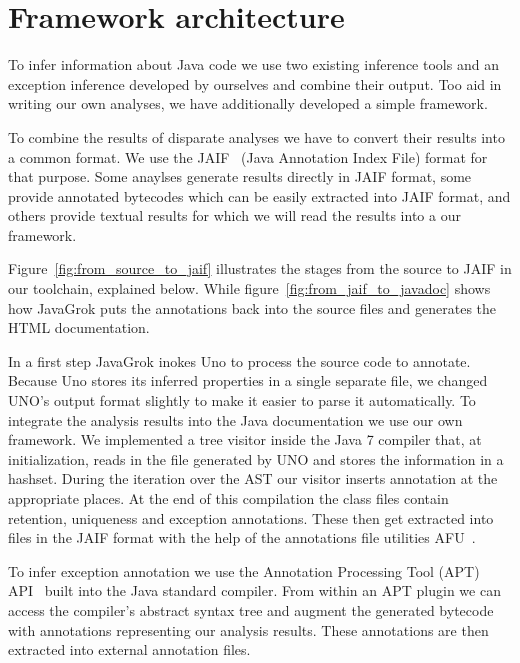 \section{Framework architecture}

\begin{figure*}
\centering
{}
\caption{Toolchain from source to JAIF}
\label{fig:from_source_to_jaif}
\end{figure*}

To infer information about Java code we use two existing inference tools and 
an exception inference developed by ourselves and combine their output. 
Too aid in writing our own analyses, we have additionally developed a simple 
framework. 

To combine the results of disparate analyses we have to convert their results
into a common format.  We use the JAIF~\cite{JAIF}
(Java Annotation Index File) format for that purpose.  Some anaylses generate
results directly in JAIF format, some provide annotated bytecodes which can be
easily extracted into JAIF format, and others provide textual results for which
we will read the results into a our framework.

Figure~\ref{fig:from_source_to_jaif} 
illustrates the stages from the source to JAIF in our toolchain, explained 
below. While figure~\ref{fig:from_jaif_to_javadoc} shows how JavaGrok
puts the annotations back into the source files and generates the HTML
documentation.

In a first step JavaGrok inokes Uno to process the source code to annotate. 
Because Uno stores its inferred properties in a single separate file, 
we changed UNO's output format slightly to make it easier to parse it automatically.
To integrate the analysis results into the Java documentation we
use our own framework. We implemented a tree visitor inside the Java 7 
compiler that, at initialization, reads in the file generated by UNO and 
stores the information in a hashset. During the iteration over the AST
our visitor inserts annotation at the appropriate places. At the end of
this compilation the class files contain retention, uniqueness and exception 
annotations. These then get extracted into files in the JAIF format with the
help of the annotations file utilities AFU~\cite{AFU}.

To infer exception annotation we use the Annotation Processing Tool (APT)
API~\cite{apt} built into the Java standard compiler.
From within an APT plugin
we can access the compiler's abstract syntax tree and augment the generated
bytecode with annotations representing our analysis results. These annotations
are then extracted into external annotation files.

